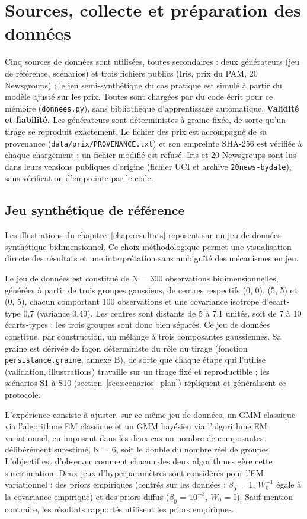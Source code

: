 \section{Sources, collecte et préparation des données}\label{sec:donnees}
Cinq sources de données sont utilisées, toutes secondaires : deux générateurs (jeu de référence, scénarios) et trois fichiers publics (Iris, prix du PAM, 20 Newsgroups) ; le jeu semi-synthétique du cas pratique est simulé à partir du modèle ajusté sur les prix. Toutes sont chargées par du code écrit pour ce mémoire (\texttt{donnees.py}), sans bibliothèque d'apprentissage automatique. \textbf{Validité et fiabilité.} Les générateurs sont déterministes à graine fixée, de sorte qu'un tirage se reproduit exactement. Le fichier des prix est accompagné de sa provenance (\texttt{data/prix/PROVENANCE.txt}) et son empreinte SHA-256 est vérifiée à chaque chargement : un fichier modifié est refusé. Iris et 20 Newsgroups sont lus dans leurs versions publiques d'origine (fichier UCI et archive \texttt{20news-bydate}), sans vérification d'empreinte par le code.

\subsection{Jeu synthétique de référence}\label{sec:donnees_reference}
Les illustrations du chapitre~\ref{chap:resultats} reposent sur un jeu de données synthétique bidimensionnel. Ce choix méthodologique permet une visualisation directe des résultats et une interprétation sans ambiguïté des mécanismes en jeu.

Le jeu de données est constitué de N = 300 observations bidimensionnelles, générées à partir de trois groupes gaussiens, de centres respectifs (0, 0), (5, 5) et (0, 5), chacun comportant 100 observations et une covariance isotrope d'écart-type 0,7 (variance 0,49). Les centres sont distants de 5 à 7,1 unités, soit de 7 à 10 écarts-types : les trois groupes sont donc bien séparés. Ce jeu de données constitue, par construction, un mélange à trois composantes gaussiennes. Sa graine est dérivée de façon déterministe du rôle du tirage (fonction \texttt{persistance.graine}, annexe B), de sorte que chaque étape qui l'utilise (validation, illustrations) travaille sur un tirage fixé et reproductible ; les scénarios S1 à S10 (section~\ref{sec:scenarios_plan}) répliquent et généralisent ce protocole.

L'expérience consiste à ajuster, sur ce même jeu de données, un GMM classique via l'algorithme EM classique et un GMM bayésien via l'algorithme EM variationnel, en imposant dans les deux cas un nombre de composantes délibérément surestimé, K = 6, soit le double du nombre réel de groupes. L'objectif est d'observer comment chacun des deux algorithmes gère cette surestimation. Deux jeux d'hyperparamètres sont considérés pour l'EM variationnel : des priors empiriques (centrés sur les données : $\beta _{0}$ = 1, $W_{0}^{-1}$ égale à la covariance empirique) et des priors diffus ($\beta _{0}$ = $10^{-3}$, $W_{0}$ = I). Sauf mention contraire, les résultats rapportés utilisent les priors empiriques.

